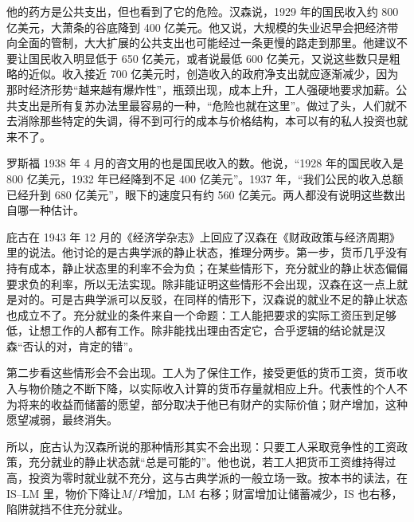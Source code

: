 他的药方是公共支出，但也看到了它的危险。汉森说，1929 年的国民收入约 800 亿美元，大萧条的谷底降到 400 亿美元\cite{hansen1939}。他又说，大规模的失业迟早会把经济带向全面的管制，大大扩展的公共支出也可能经过一条更慢的路走到那里\cite{hansen1939}。他建议不要让国民收入明显低于 650 亿美元，或者说最低 600 亿美元，又说这些数只是粗略的近似\cite{hansen1939}。收入接近 700 亿美元时，创造收入的政府净支出就应逐渐减少，因为那时经济形势“越来越有爆炸性”，瓶颈出现，成本上升，工人强硬地要求加薪\cite{hansen1939}。公共支出是所有复苏办法里最容易的一种，“危险也就在这里”。做过了头，人们就不去消除那些特定的失调，得不到可行的成本与价格结构，本可以有的私人投资也就来不了\cite{hansen1939}。

罗斯福 1938 年 4 月的咨文用的也是国民收入的数。他说，“1928 年的国民收入是 800 亿美元，1932 年已经降到不足 400 亿美元”\cite{app1938}。1937 年，“我们公民的收入总额已经升到 680 亿美元”，眼下的速度只有约 560 亿美元\cite{app1938}。两人都没有说明这些数出自哪一种估计。

庇古在 1943 年 12 月的《经济学杂志》上回应了汉森在《财政政策与经济周期》里的说法\cite{pigou1943}。他讨论的是古典学派的静止状态，推理分两步。第一步，货币几乎没有持有成本，静止状态里的利率不会为负；在某些情形下，充分就业的静止状态偏偏要求负的利率，所以无法实现\cite{pigou1943}。除非能证明这些情形不会出现，汉森在这一点上就是对的\cite{pigou1943}。可是古典学派可以反驳，在同样的情形下，汉森说的就业不足的静止状态也成立不了\cite{pigou1943}。充分就业的条件来自一个命题：工人能把要求的实际工资压到足够低，让想工作的人都有工作\cite{pigou1943}。除非能找出理由否定它，合乎逻辑的结论就是汉森“否认的对，肯定的错”\cite{pigou1943}。

第二步看这些情形会不会出现。工人为了保住工作，接受更低的货币工资，货币收入与物价随之不断下降，以实际收入计算的货币存量就相应上升\cite{pigou1943}。代表性的个人不为将来的收益而储蓄的愿望，部分取决于他已有财产的实际价值；财产增加，这种愿望减弱，最终消失\cite{pigou1943}。

所以，庇古认为汉森所说的那种情形其实不会出现：只要工人采取竞争性的工资政策，充分就业的静止状态就“总是可能的”\cite{pigou1943}。他也说，若工人把货币工资维持得过高，投资为零时就业就不充分，这与古典学派的一般立场一致\cite{pigou1943}。按本书的读法，在 IS–LM 里，物价下降让$M/P$增加，LM 右移；财富增加让储蓄减少，IS 也右移，陷阱就挡不住充分就业。

